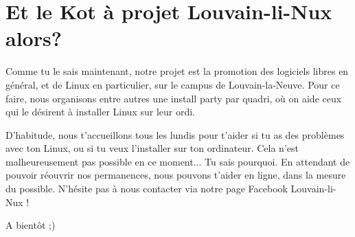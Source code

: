 \documentclass[10pt]{../fiche}
\begin{document}
\section*{Et le Kot à projet Louvain-li-Nux alors?}
Comme tu le sais maintenant, notre projet est la promotion des logiciels libres en général, et de Linux en particulier, sur le campus de Louvain-la-Neuve.
Pour ce faire, nous organisons entre autres une install party par quadri, où on aide ceux qui le désirent à installer Linux sur leur ordi.

D'habitude, nous t'accueillons tous les lundis pour t'aider si tu as des problèmes avec ton Linux, ou si tu veux l'installer sur ton ordinateur. Cela n'est malheureusement pas possible en ce moment... Tu sais pourquoi. En attendant de pouvoir réouvrir nos permanences, nous pouvons t'aider en ligne, dans la mesure du possible. N'hésite pas à nous contacter via notre page Facebook Louvain-li-Nux !

A bientôt ;)
\end{document}
